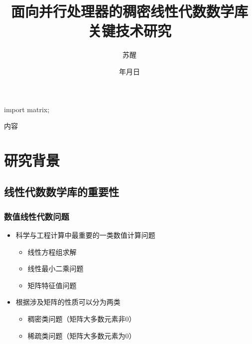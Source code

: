 \documentclass[aspectratio=169]{beamer}
\title[并行处理器稠密线性代数数学库]{面向并行处理器的稠密线性代数数学库\\关键技术研究}
\author[苏醒]{苏醒\inst{1}}
\institute[计算机学院软件所] %
{
  \inst{1}
  计算机学院软件所
}
\date{\number\year{}年{}\number\month{}月{}\number\day{}日}
\begin{document}
\begin{asydef}
  import matrix;
\end{asydef}

\begin{frame}
  \titlepage
\end{frame}

\begin{frame}{内容}
  \tableofcontents
\end{frame}





\section{研究背景}

\subsection[重要性]{线性代数数学库的重要性}

\begin{frame}
  \frametitle{数值线性代数问题}
  \begin{itemize}
  \item 科学与工程计算中最重要的一类数值计算问题
    \begin{itemize}
    \item 线性方程组求解
    \item 线性最小二乘问题
    \item 矩阵特征值问题
    \end{itemize}
  \item 根据涉及矩阵的性质可以分为两类
    \begin{itemize}
    \item 稠密类问题（矩阵大多数元素非0）
    \item 稀疏类问题（矩阵大多数元素为0）
    \end{itemize}
  \end{itemize}
\end{frame}
\end{document}
